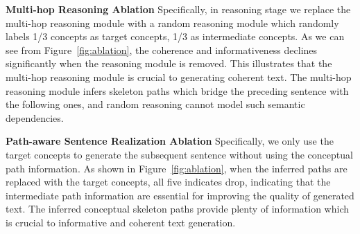 \documentclass[letterpaper]{article} %
\begin{document}
\medskip\noindent\textbf{Multi-hop Reasoning Ablation}\hspace{1em}
Specifically, in reasoning stage we replace the  multi-hop reasoning module with a random reasoning module which randomly labels 1/3 concepts as target concepts, 1/3 as intermediate concepts. As we can see from Figure~\ref{fig:ablation}, the coherence and informativeness declines significantly when the reasoning module is removed. This illustrates that the multi-hop reasoning module is crucial to generating coherent text. The multi-hop reasoning module infers skeleton paths which bridge the  preceding sentence with the following ones, and random reasoning cannot model such semantic dependencies. 

\medskip\noindent\textbf{Path-aware Sentence Realization Ablation}\hspace{1em}
Specifically, we only use the target concepts to generate the subsequent sentence without using the conceptual path information. As shown in Figure~\ref{fig:ablation}, when the inferred paths are replaced with the target concepts, all five indicates drop, indicating that the intermediate path information are essential for improving the quality of generated text. The inferred conceptual skeleton paths provide plenty of information which is crucial to  informative and coherent text generation.    

\end{document}
